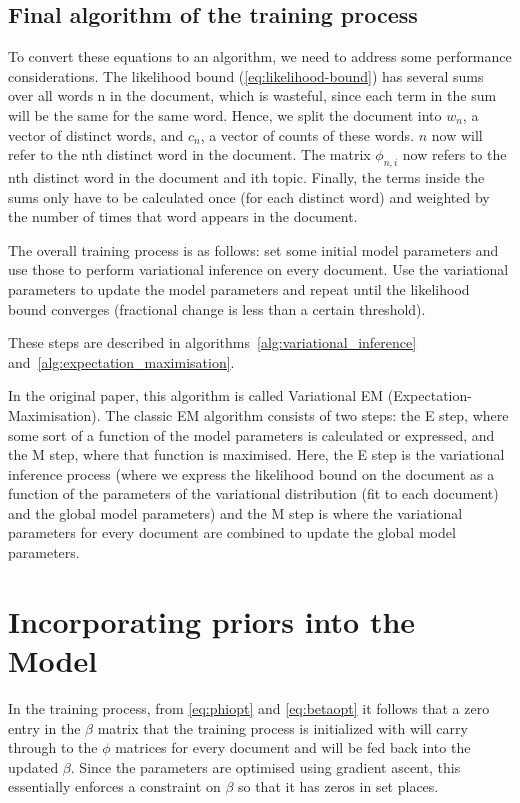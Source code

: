 \documentclass[12pt,a4paper,twoside,openright]{report}
\begin{document}
\subsection{Final algorithm of the training process}

To convert these equations to an algorithm, we need to address some performance considerations. The likelihood bound (\ref{eq:likelihood-bound}) has several sums over all words n in the document, which is wasteful, since each term in the sum will be the same for the same word. Hence, we split the document into $w_n$, a vector of distinct words, and $c_n$, a vector of counts of these words. $n$ now will refer to the nth distinct word in the document. The matrix $\phi_{n, i}$ now refers to the nth distinct word in the document and ith topic. Finally, the terms inside the sums only have to be calculated once (for each distinct word) and weighted by the number of times that word appears in the document.

The overall training process is as follows: set some initial model parameters and use those to perform variational inference on every document. Use the variational parameters to update the model parameters and repeat until the likelihood bound converges (fractional change is less than a certain threshold).

These steps are described in algorithms~\ref{alg:variational_inference} and~\ref{alg:expectation_maximisation}. 

In the original paper, this algorithm is called Variational EM (Expectation-Maximisation). The classic EM algorithm consists of two steps: the E step, where some sort of a function of the model parameters is calculated or expressed, and the M step, where that function is maximised. Here, the E step is the variational inference process (where we express the likelihood bound on the document as a function of the parameters of the variational distribution (fit to each document) and the global model parameters) and the M step is where the variational parameters for every document are combined to update the global model parameters.



\section{Incorporating priors into the Model}

In the training process, from \eqref{eq:phiopt} and \eqref{eq:betaopt} it follows that a zero entry in the $\beta$ matrix that the training process is initialized with will carry through to the $\phi$ matrices for every document and will be fed back into the updated $\beta$. Since the parameters are optimised using gradient ascent, this essentially enforces a constraint on $\beta$ so that it has zeros in set places.
\end{document}
